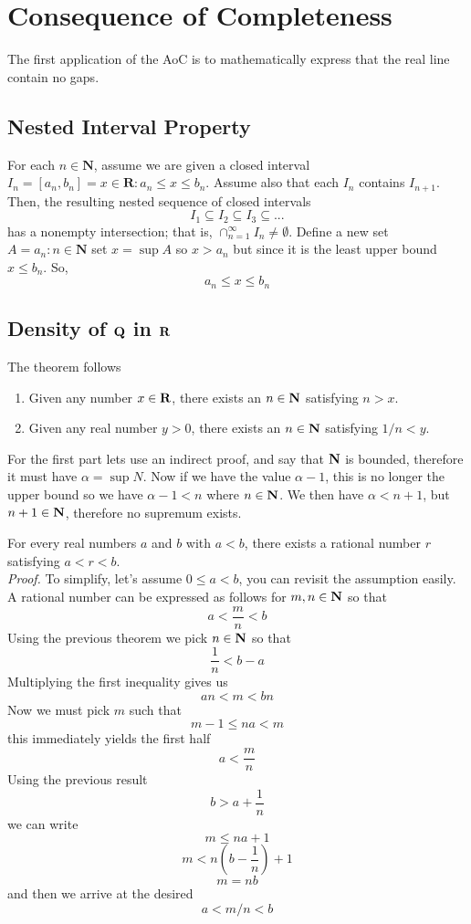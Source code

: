 \section{Consequence of Completeness}
The first application of the AoC is to mathematically express that the real line contain no gaps.
\subsection{Nested Interval Property}
\begin{theorem}
	For each $ n \in \textbf{N} $, assume we are given a closed interval $ I_n = [a_n, b_n] = {x \in \textbf{R}: a_n \leq x \leq b_n}$. Assume also that each $ I_n $ contains $ I_{n+1} $. Then, the resulting nested sequence of closed intervals
	\[ I_1 \subseteq I_2 \subseteq I_3 \subseteq ... \]
	has a nonempty intersection; that is, $ \cap_{n =1}^\infty I_n \neq \emptyset$.
	Define a new set $ A = {a_n : n \in \textbf{N}} $ set $ x = \sup A $ so $ x > a_n $ but since it is the least upper bound $ x \leq b_n $. So, \[ a_n \leq x \leq b_n \]
\end{theorem}
\subsection{Density of $ \Q $ in $ \R $}
\begin{theorem}
	The theorem follows
	\begin{enumerate}
		\item Given any number $ x \in \textbf{R}$, there exists an $ n \in \textbf{N} $ satisfying $ n > x $. 
		\item Given any real number $ y > 0 $, there exists an $ n \in \textbf{N} $ satisfying $ 1/n < y $.
	\end{enumerate}
	For the first part lets use an indirect proof, and say that $ \textbf{N} $ is bounded, therefore it must have $ \alpha = \sup N $. Now if we have the value $ \alpha - 1 $, this is no longer the upper bound so we have $ \alpha -1 < n $ where $ n \in \textbf{N} $. We then have $ \alpha < n + 1 $, but $ n+1 \in \textbf{N} $, therefore no supremum exists. 
\end{theorem}
\begin{theorem}[Density of $ \Q $ in $ \R $]
	For every real numbers $ a $ and $ b $ with $ a < b $, there exists a rational number $ r $ satisfying $ a < r < b $. \\
	\textit{Proof.} To simplify, let's assume $ 0 \leq a < b $, you can revisit the assumption easily. A rational number can be expressed as follows for $ m, n \in \textbf{N} $ so that \[ a < \dfrac{m}{n} < b\] Using the previous theorem we pick $ n \in \textbf{N} $ so that \[ \dfrac{1}{n} < b -a \] Multiplying the first inequality gives us \[ an < m < bn \] Now we must pick $ m $ such that \[ m -1 \leq na < m \] this immediately yields the first half \[ a < \dfrac{m}{n} \] Using the previous result \[ b > a + \dfrac{1}{n} \] we can write 
	\[ m \leq na + 1 \]
	\[ m < n \left(b - \dfrac{1}{n}\right) + 1 \]
	\[ m = nb \] and then we arrive at the desired 
	\[ a < m/n <b \]
\end{theorem}
